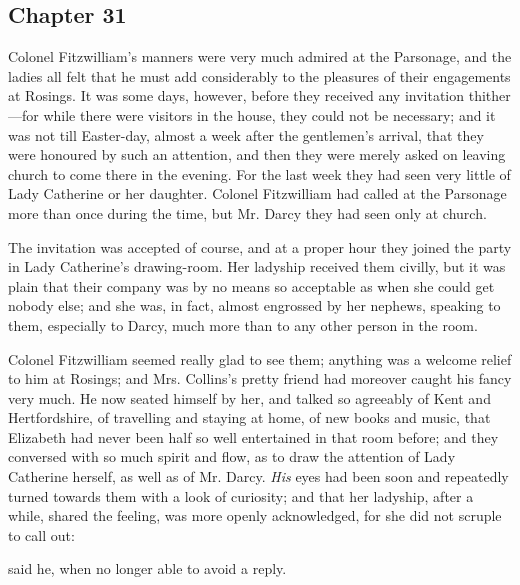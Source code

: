 \subsection[chapter-31]{\useURL[url31][][][]\from[url31] Chapter 31}

Colonel Fitzwilliam's manners were very much admired at the Parsonage, and the ladies all felt that he must add considerably to the pleasures of their engagements at Rosings. It was some days, however, before they received any invitation thither---for while there were visitors in the house, they could not be necessary; and it was not till Easter-day, almost a week after the gentlemen's arrival, that they were honoured by such an attention, and then they were merely asked on leaving church to come there in the evening. For the last week they had seen very little of Lady Catherine or her daughter. Colonel Fitzwilliam had called at the Parsonage more than once during the time, but Mr. Darcy they had seen only at church.

The invitation was accepted of course, and at a proper hour they joined the party in Lady Catherine's drawing-room. Her ladyship received them civilly, but it was plain that their company was by no means so acceptable as when she could get nobody else; and she was, in fact, almost engrossed by her nephews, speaking to them, especially to Darcy, much more than to any other person in the room.

Colonel Fitzwilliam seemed really glad to see them; anything was a welcome relief to him at Rosings; and Mrs. Collins's pretty friend had moreover caught his fancy very much. He now seated himself by her, and talked so agreeably of Kent and Hertfordshire, of travelling and staying at home, of new books and music, that Elizabeth had never been half so well entertained in that room before; and they conversed with so much spirit and flow, as to draw the attention of Lady Catherine herself, as well as of Mr. Darcy. {\em His} eyes had been soon and repeatedly turned towards them with a look of curiosity; and that her ladyship, after a while, shared the feeling, was more openly acknowledged, for she did not scruple to call out:


 said he, when no longer able to avoid a reply.


